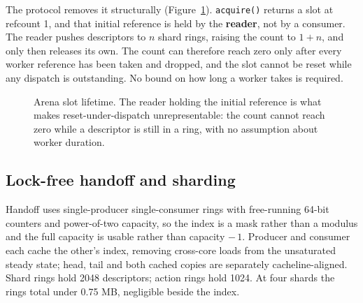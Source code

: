 \documentclass[sigconf,nonacm]{acmart}
\begin{document}
The protocol removes it structurally (Figure~\ref{fig:arena}). \texttt{acquire()} returns a
slot at refcount 1, and that initial reference is held by the \textbf{reader}, not by a
consumer. The reader pushes descriptors to $n$ shard rings, raising the count to $1 + n$, and
only then releases its own. The count can therefore reach zero only after every worker
reference has been taken and dropped, and the slot cannot be reset while any dispatch is
outstanding. No bound on how long a worker takes is required.

\begin{figure}[t]
\centering
{}
\caption{Arena slot lifetime. The reader holding the initial reference is what makes
reset-under-dispatch unrepresentable: the count cannot reach zero while a descriptor is still
in a ring, with no assumption about worker duration.}
\label{fig:arena}
\end{figure}

\subsection{Lock-free handoff and sharding}

Handoff uses single-producer single-consumer rings with free-running 64-bit counters and
power-of-two capacity, so the index is a mask rather than a modulus and the full capacity is
usable rather than capacity $-\,1$. Producer and consumer each cache the other's index,
removing cross-core loads from the unsaturated steady state; head, tail and both cached copies
are separately cacheline-aligned. Shard rings hold 2048 descriptors; action rings hold 1024. At
four shards the rings total under 0.75 MB, negligible beside the index.
\end{document}
